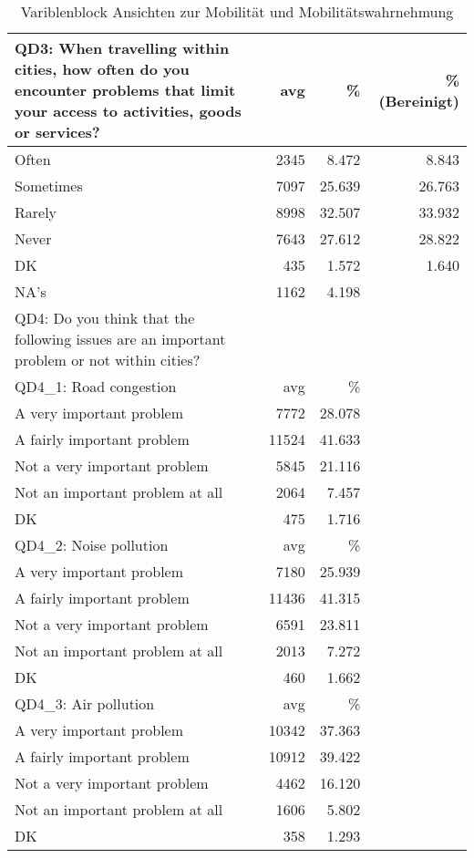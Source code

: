 \begin{table}
	\begin{tabularx}{\textwidth} { b{8cm} | r | r | r}
		QD3: When travelling within cities, how often do you encounter problems that limit your access to
activities, goods or services? & avg & \% & \% (Bereinigt) \\ \hline
		Often      &    2345 &  8.472  &       8.843  \\
		Sometimes  &    7097 & 25.639  &      26.763  \\
		Rarely     &    8998 & 32.507  &      33.932  \\
		Never      &    7643 & 27.612  &      28.822  \\
		DK         &     435 &  1.572  &       1.640  \\
		NA's       &    1162 &  4.198  \\ \hline
		QD4: Do you think that the following issues are an important problem or not within cities? \\ \hline
		QD4\_1: Road congestion & avg & \% \\ \hline 
		A very important problem        &     7772 & 28.078 \\
A fairly important problem          &    11524 & 41.633 \\
Not a very important problem        &     5845 & 21.116 \\
Not an important problem at all     &     2064 &  7.457 \\
DK                                  &      475 &  1.716 \\ \hline
		QD4\_2: Noise pollution & avg & \% \\ \hline 
		A very important problem        &     7180 & 25.939 \\
A fairly important problem          &    11436 & 41.315 \\
Not a very important problem        &     6591 & 23.811 \\
Not an important problem at all     &     2013 &  7.272 \\
DK                                  &      460 &  1.662 \\ \hline
		QD4\_3: Air pollution & avg & \% \\ \hline 

A very important problem            &    10342 & 37.363 \\
A fairly important problem          &    10912 & 39.422 \\
Not a very important problem        &     4462 & 16.120 \\
Not an important problem at all     &     1606 &  5.802 \\
DK                                  &      358 &  1.293 \\

	\end{tabularx}
	\caption{Variblenblock Ansichten zur Mobilität und Mobilitätswahrnehmung}
\end{table}

